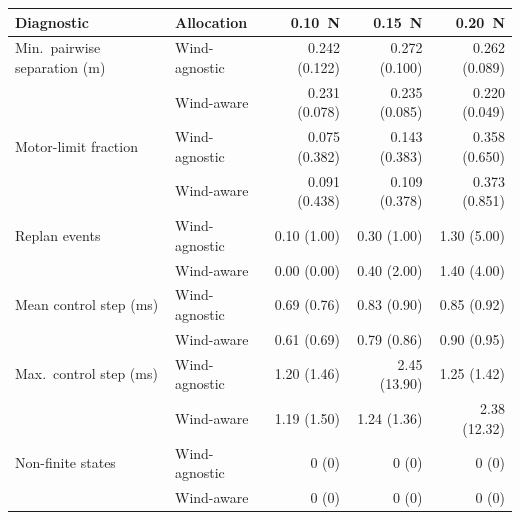\begingroup\footnotesize
\begin{tabular}{llrrr}
\toprule
Diagnostic & Allocation & 0.10~N & 0.15~N & 0.20~N \\
\midrule
Min.\ pairwise separation (m) & Wind-agnostic & 0.242 (0.122) & 0.272 (0.100) & 0.262 (0.089) \\
 & Wind-aware & 0.231 (0.078) & 0.235 (0.085) & 0.220 (0.049) \\
Motor-limit fraction & Wind-agnostic & 0.075 (0.382) & 0.143 (0.383) & 0.358 (0.650) \\
 & Wind-aware & 0.091 (0.438) & 0.109 (0.378) & 0.373 (0.851) \\
Replan events & Wind-agnostic & 0.10 (1.00) & 0.30 (1.00) & 1.30 (5.00) \\
 & Wind-aware & 0.00 (0.00) & 0.40 (2.00) & 1.40 (4.00) \\
Mean control step (ms) & Wind-agnostic & 0.69 (0.76) & 0.83 (0.90) & 0.85 (0.92) \\
 & Wind-aware & 0.61 (0.69) & 0.79 (0.86) & 0.90 (0.95) \\
Max.\ control step (ms) & Wind-agnostic & 1.20 (1.46) & 2.45 (13.90) & 1.25 (1.42) \\
 & Wind-aware & 1.19 (1.50) & 1.24 (1.36) & 2.38 (12.32) \\
Non-finite states & Wind-agnostic & 0 (0) & 0 (0) & 0 (0) \\
 & Wind-aware & 0 (0) & 0 (0) & 0 (0) \\
\bottomrule
\end{tabular}
\endgroup
